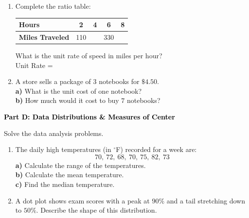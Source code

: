 \documentclass[12pt, letterpaper, fleqn]{article}
\newcommand{\blanklong}{\underline{\hspace{6.5cm}}}
\newcommand{\blankshorter}{\underline{\hspace{1.5cm}}}
\begin{document}
\begin{enumerate}[itemsep=2.5cm, leftmargin=0.6cm]
\item Complete the ratio table:
\begin{center}
\begin{tabular}{|l|c|c|c|r|}
\hline
\textbf{Hours} & 2 & 4 & 6 & 8 \\ \hline
\textbf{Miles Traveled} & 110 & \blankshorter & 330 & \blankshorter \\
\hline
\end{tabular}
\end{center}
\vspace{0.5cm}
What is the unit rate of speed in miles per hour? \\
Unit Rate = \blanklong

\item A store sells a package of $3$ notebooks for $\$4.50$. \\
\textbf{a)} What is the unit cost of one notebook? \blanklong \\
\textbf{b)} How much would it cost to buy $7$ notebooks? \blanklong
\end{enumerate}

\newpage

\begin{tcolorbox}[colback=black!10]
    \large\textcolor{black}{\textbf{Part D: Data Distributions \& Measures of Center}}
\end{tcolorbox}

\vspace{3mm}

\noindent
Solve the data analysis problems.

\vspace{5mm}

\begin{enumerate}[itemsep=2.5cm, leftmargin=0.6cm]
\item The daily high temperatures (in $^\circ$F) recorded for a week are: \\
$$70, \ 72, \ 68, \ 70, \ 75, \ 82, \ 73$$
\textbf{a)} Calculate the range of the temperatures. \blanklong \\
\textbf{b)} Calculate the mean temperature. \blanklong \\
\textbf{c)} Find the median temperature. \blanklong

\item A dot plot shows exam scores with a peak at $90\%$ and a tail stretching down to $50\%$. Describe the shape of this distribution.
\end{enumerate}
\end{document}
